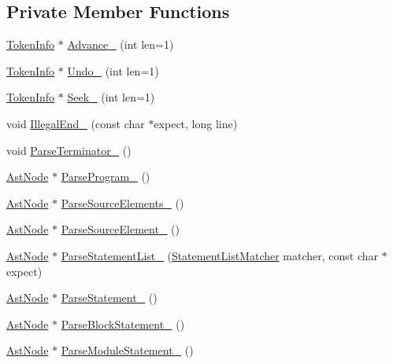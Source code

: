 \subsection*{Private Member Functions}
\begin{DoxyCompactItemize}
\item 
\hyperlink{classmocha_1_1_token_info}{TokenInfo} $\ast$ \hyperlink{classmocha_1_1_parser_a83f86da3309f45b0be097d2e8c529309}{Advance\_\-} (int len=1)
\item 
\hyperlink{classmocha_1_1_token_info}{TokenInfo} $\ast$ \hyperlink{classmocha_1_1_parser_a1e49a5eca48e337c8fffcd015ff69e46}{Undo\_\-} (int len=1)
\item 
\hyperlink{classmocha_1_1_token_info}{TokenInfo} $\ast$ \hyperlink{classmocha_1_1_parser_a6393b5183496eb57961686c2f554f389}{Seek\_\-} (int len=1)
\item 
void \hyperlink{classmocha_1_1_parser_a49c65e57150f65bdc8b8536be9e66b20}{IllegalEnd\_\-} (const char $\ast$expect, long line)
\item 
void \hyperlink{classmocha_1_1_parser_aaee55d26deb96653097449f76dac3cd5}{ParseTerminator\_\-} ()
\item 
\hyperlink{classmocha_1_1_ast_node}{AstNode} $\ast$ \hyperlink{classmocha_1_1_parser_a49f48f2b0ee2eb35265aaac502e1cf67}{ParseProgram\_\-} ()
\item 
\hyperlink{classmocha_1_1_ast_node}{AstNode} $\ast$ \hyperlink{classmocha_1_1_parser_a686ff1f23dac03466e5b0a2d1bd5a765}{ParseSourceElements\_\-} ()
\item 
\hyperlink{classmocha_1_1_ast_node}{AstNode} $\ast$ \hyperlink{classmocha_1_1_parser_a063cf897a654b2bf0ab5926e1055a89e}{ParseSourceElement\_\-} ()
\item 
\hyperlink{classmocha_1_1_ast_node}{AstNode} $\ast$ \hyperlink{classmocha_1_1_parser_afd1b8949d5eae0ae9b9308e5de69cb00}{ParseStatementList\_\-} (\hyperlink{classmocha_1_1_parser_aa1eb16ae11106052906d8e5b964daf28}{StatementListMatcher} matcher, const char $\ast$expect)
\item 
\hyperlink{classmocha_1_1_ast_node}{AstNode} $\ast$ \hyperlink{classmocha_1_1_parser_a148722a488bba6f40bb8d17447e02209}{ParseStatement\_\-} ()
\item 
\hyperlink{classmocha_1_1_ast_node}{AstNode} $\ast$ \hyperlink{classmocha_1_1_parser_ae24d295121c47eaa89236de42619343c}{ParseBlockStatement\_\-} ()
\item 
\hyperlink{classmocha_1_1_ast_node}{AstNode} $\ast$ \hyperlink{classmocha_1_1_parser_ad5ea9e452282b85bb2f6b0dba6032e2e}{ParseModuleStatement\_\-} ()

\end{DoxyCompactItemize}
